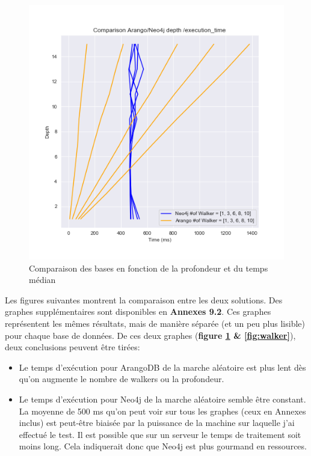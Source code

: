 \documentclass{article} %
\begin{document}
\begin{figure}[!h]
 \centering
 \includegraphics[keepaspectratio = true,scale=0.7]{comparison_depth_time.png}
 \caption{Comparaison des bases en fonction de la profondeur et du temps médian}
 \label{fig:depthtime}
\end{figure}

Les figures suivantes montrent la comparaison entre les deux solutions. Des graphes supplémentaires sont disponibles en \textbf{Annexes 9.2}. Ces graphes représentent les mêmes résultats, mais de manière séparée (et un peu plus lisible) pour chaque base de données.
De ces deux graphes (\textbf{figure \ref{fig:depthtime} \& \ref{fig:walker}}), deux conclusions peuvent être tirées:
\begin{itemize}
 \item Le temps d’exécution pour ArangoDB de la marche aléatoire est plus lent dès qu’on augmente le nombre de walkers ou la profondeur.
 \item Le temps d’exécution pour Neo4j de la marche aléatoire semble être constant. La moyenne de 500 ms qu’on peut voir sur tous les graphes (ceux en Annexes inclus) est peut-être biaisée par la puissance de la machine sur laquelle j'ai effectué le test. Il est possible que sur un serveur le temps de traitement soit moins long. Cela indiquerait donc que Neo4j est plus gourmand en ressources.
\end{itemize}
\end{document}

